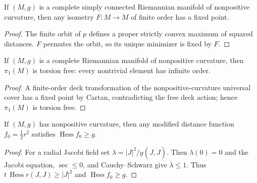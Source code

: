 \begin{theorem}
  \label{thm:pet-ch6-cartan-fixed-point}

  If $(M,g)$ is a complete simply connected Riemannian manifold of nonpositive
  curvature, then any isometry $F:M\to M$ of finite order has a fixed point.
\end{theorem}
\begin{proof}
  \sketch
  The finite orbit of \(p\) defines a proper strictly convex maximum of squared distances. \(F\) permutes the orbit, so its unique minimizer is fixed by \(F\).
\end{proof}

\begin{corollary}
  \label{cor:pet-ch6-torsion-free-fundamental-group}

  If $(M,g)$ is a complete Riemannian manifold of nonpositive curvature, then
  $\pi_1(M)$ is torsion free: every nontrivial element has infinite order.
\end{corollary}
\begin{proof}
  \sketch
  A finite-order deck transformation of the nonpositive-curvature universal cover has a fixed point by Cartan, contradicting the free deck action; hence \(\pi_1(M)\) is torsion free.
\end{proof}

\begin{lemma}
  \label{lem:pet-ch6-hessian-lower-bound}

  If $(M,g)$ has nonpositive curvature, then any modified distance function
  $f_0=\tfrac12r^2$ satisfies $\operatorname{Hess}f_0\ge g$.
\end{lemma}
\begin{proof}
  \sketch
  For a radial Jacobi field set \(\lambda=|J|^2/g(J,\dot J)\). Then \(\lambda(0)=0\) and the Jacobi equation, \(\sec\le0\), and Cauchy--Schwarz give \(\dot\lambda\le1\). Thus \(t\,\operatorname{Hess}r(J,J)\ge|J|^2\) and \(\operatorname{Hess}f_0\ge g\).
\end{proof}

